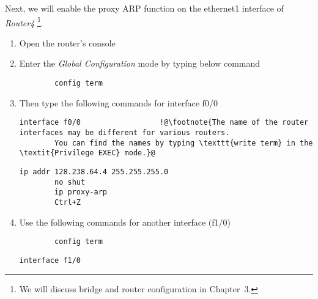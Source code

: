 \documentclass{UTNetLab}
\begin{document}
    Next, we will enable the proxy ARP function on the ethernet1 interface of \textit{Router4}
    \footnote{We will discuss bridge and router configuration in Chapter~3.}.
    \begin{enumerate}
        \item Open the router's console 
        \item Enter the \textit{Global Configuration} mode by typing below command
        
        \begin{lstlisting}
        config term
        \end{lstlisting}
    
        \item Then type the following commands for interface f0/0
        
        \begin{lstlisting}[language={cisco}, escapechar={@}, emph={x}]
        interface f0/0                  !@\footnote{The name of the router interfaces may be different for various routers.
        You can find the names by typing \texttt{write term} in the \textit{Privilege EXEC} mode.}@ 
        \end{lstlisting}
        
        \begin{lstlisting}[language={cisco}, escapechar={@}, emph={x}]
        ip addr 128.238.64.4 255.255.255.0
        no shut
        ip proxy-arp
        Ctrl+Z
        \end{lstlisting}
        
        \item Use the following commands for another interface (f1/0)
        
        \begin{lstlisting}
        config term
        \end{lstlisting}
        
        \begin{lstlisting}[language={cisco}, escapechar={@}, emph={x}]
        interface f1/0 
        \end{lstlisting}
        

\end{enumerate}
\end{document}

